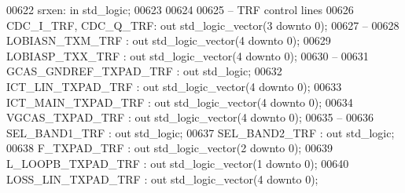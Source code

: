 \begin{DoxyCode}
00622         srxen: \textcolor{keywordflow}{in} \textcolor{comment}{std\_logic};
00623         
00624     
00625 \textcolor{keyword}{        -- TRF control lines}
00626         CDC\_I\_TRF, CDC\_Q\_TRF:   \textcolor{keywordflow}{out} \textcolor{comment}{std\_logic\_vector}(\textcolor{vhdllogic}{}\textcolor{vhdllogic}{3} \textcolor{keywordflow}{downto} \textcolor{vhdllogic}{}\textcolor{vhdllogic}{0});
00627 \textcolor{keyword}{        --}
00628         LOBIASN\_TXM\_TRF             : \textcolor{keywordflow}{out} \textcolor{comment}{std\_logic\_vector}(\textcolor{vhdllogic}{}\textcolor{vhdllogic}{4} \textcolor{keywordflow}{downto} \textcolor{vhdllogic}{}\textcolor{vhdllogic}{0});
00629         LOBIASP\_TXX\_TRF             : \textcolor{keywordflow}{out} \textcolor{comment}{std\_logic\_vector}(\textcolor{vhdllogic}{}\textcolor{vhdllogic}{4} \textcolor{keywordflow}{downto} \textcolor{vhdllogic}{}\textcolor{vhdllogic}{0});
00630 \textcolor{keyword}{        --}
00631         GCAS\_GNDREF\_TXPAD\_TRF   : \textcolor{keywordflow}{out} \textcolor{comment}{std\_logic};
00632         ICT\_LIN\_TXPAD\_TRF           : \textcolor{keywordflow}{out} \textcolor{comment}{std\_logic\_vector}(\textcolor{vhdllogic}{}\textcolor{vhdllogic}{4} \textcolor{keywordflow}{downto} \textcolor{vhdllogic}{}\textcolor{vhdllogic}{0});
00633         ICT\_MAIN\_TXPAD\_TRF      : \textcolor{keywordflow}{out} \textcolor{comment}{std\_logic\_vector}(\textcolor{vhdllogic}{}\textcolor{vhdllogic}{4} \textcolor{keywordflow}{downto} \textcolor{vhdllogic}{}\textcolor{vhdllogic}{0});
00634         VGCAS\_TXPAD\_TRF             : \textcolor{keywordflow}{out} \textcolor{comment}{std\_logic\_vector}(\textcolor{vhdllogic}{}\textcolor{vhdllogic}{4} \textcolor{keywordflow}{downto} \textcolor{vhdllogic}{}\textcolor{vhdllogic}{0});
00635 \textcolor{keyword}{        --}
00636         SEL\_BAND1\_TRF                   : \textcolor{keywordflow}{out} \textcolor{comment}{std\_logic};
00637         SEL\_BAND2\_TRF                   : \textcolor{keywordflow}{out} \textcolor{comment}{std\_logic};
00638         F\_TXPAD\_TRF                     : \textcolor{keywordflow}{out} \textcolor{comment}{std\_logic\_vector}(\textcolor{vhdllogic}{}\textcolor{vhdllogic}{2} \textcolor{keywordflow}{downto} \textcolor{vhdllogic}{}\textcolor{vhdllogic}{0});
00639         L\_LOOPB\_TXPAD\_TRF           : \textcolor{keywordflow}{out} \textcolor{comment}{std\_logic\_vector}(\textcolor{vhdllogic}{}\textcolor{vhdllogic}{1} \textcolor{keywordflow}{downto} \textcolor{vhdllogic}{}\textcolor{vhdllogic}{0});
00640         LOSS\_LIN\_TXPAD\_TRF      : \textcolor{keywordflow}{out} \textcolor{comment}{std\_logic\_vector}(\textcolor{vhdllogic}{}\textcolor{vhdllogic}{4} \textcolor{keywordflow}{downto} \textcolor{vhdllogic}{}\textcolor{vhdllogic}{0});

\end{DoxyCode}
